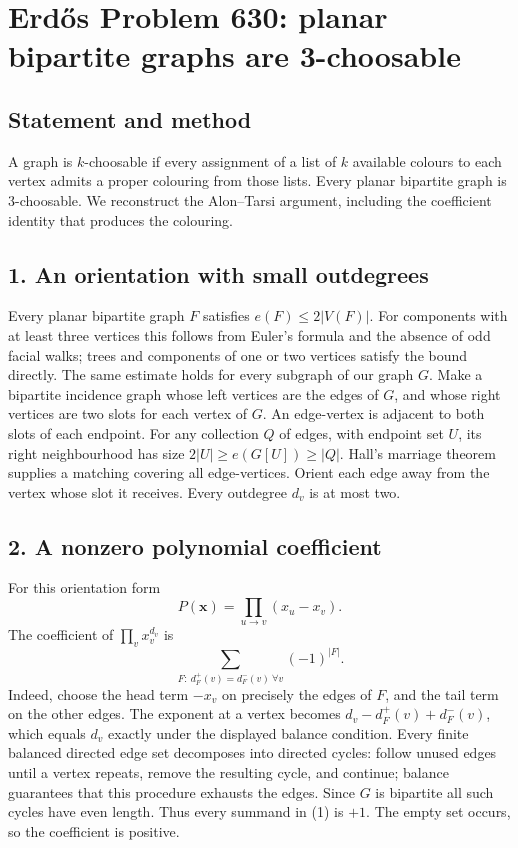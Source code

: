 \section{Erd\H{o}s Problem 630: planar bipartite graphs are 3-choosable}
\subsection*{Statement and method}
A graph is $k$-choosable if every assignment of a list of $k$ available colours to each vertex admits a proper colouring from those lists. Every planar bipartite graph is 3-choosable. We reconstruct the Alon--Tarsi argument, including the coefficient identity that produces the colouring.

\subsection*{1. An orientation with small outdegrees}
Every planar bipartite graph $F$ satisfies $e(F)\le2|V(F)|$. For components with at least three vertices this follows from Euler's formula and the absence of odd facial walks; trees and components of one or two vertices satisfy the bound directly. The same estimate holds for every subgraph of our graph $G$.
Make a bipartite incidence graph whose left vertices are the edges of $G$, and whose right vertices are two slots for each vertex of $G$. An edge-vertex is adjacent to both slots of each endpoint. For any collection $Q$ of edges, with endpoint set $U$, its right neighbourhood has size $2|U|\ge e(G[U])\ge|Q|$. Hall's marriage theorem supplies a matching covering all edge-vertices. Orient each edge away from the vertex whose slot it receives. Every outdegree $d_v$ is at most two.

\subsection*{2. A nonzero polynomial coefficient}
For this orientation form
\[
 P(\boldsymbol x)=\prod_{u\to v}(x_u-x_v).
\]
The coefficient of $\prod_vx_v^{d_v}$ is
\[
 \sum_{F:\ d_F^+(v)=d_F^-(v)\ \forall v}(-1)^{|F|}. \tag{1}
\]
Indeed, choose the head term $-x_v$ on precisely the edges of $F$, and the tail term on the other edges. The exponent at a vertex becomes $d_v-d_F^+(v)+d_F^-(v)$, which equals $d_v$ exactly under the displayed balance condition.
Every finite balanced directed edge set decomposes into directed cycles: follow unused edges until a vertex repeats, remove the resulting cycle, and continue; balance guarantees that this procedure exhausts the edges. Since $G$ is bipartite all such cycles have even length. Thus every summand in (1) is $+1$. The empty set occurs, so the coefficient is positive.


